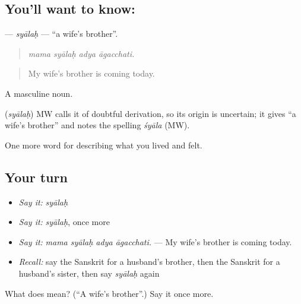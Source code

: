 \subsection*{You'll want to know: }
\textbf{} — \emph{syālaḥ} — \textquotedblleft{}a wife's brother\textquotedblright{}.

\begin{quote}
   
\end{quote}

\begin{quote}
\emph{mama syālaḥ adya āgacchati.}
\end{quote}

\begin{quote}
My wife's brother is coming today.
\end{quote}

A masculine noun.

\begin{cousinweb}
\textbf{} (\emph{syālaḥ}) MW calls it of doubtful derivation, so its origin is uncertain; it gives \textquotedblleft{}a wife's brother\textquotedblright{} and notes the spelling \emph{śyāla} (MW).
\end{cousinweb}

\begin{grammarlens}[title={What you've built}]
One more word for describing what you lived and felt.
\end{grammarlens}

\subsection*{Your turn}
\begin{itemize}
\raggedright
  \item \emph{Say it:} \emph{syālaḥ}
  \item \emph{Say it:} \emph{syālaḥ}, once more
  \item \emph{Say it:} \emph{mama syālaḥ adya āgacchati.} — My wife's brother is coming today.
  \item \emph{Recall:} say the Sanskrit for a husband's brother, then the Sanskrit for a husband's sister, then say \emph{syālaḥ} again
\end{itemize}

\begin{tcolorbox}[breakable,colback=teal!4,colframe=teal!35!black,title={Before you move on}]
What does  mean? (\textquotedblleft{}A wife's brother\textquotedblright{}.) Say it once more.
\end{tcolorbox}
